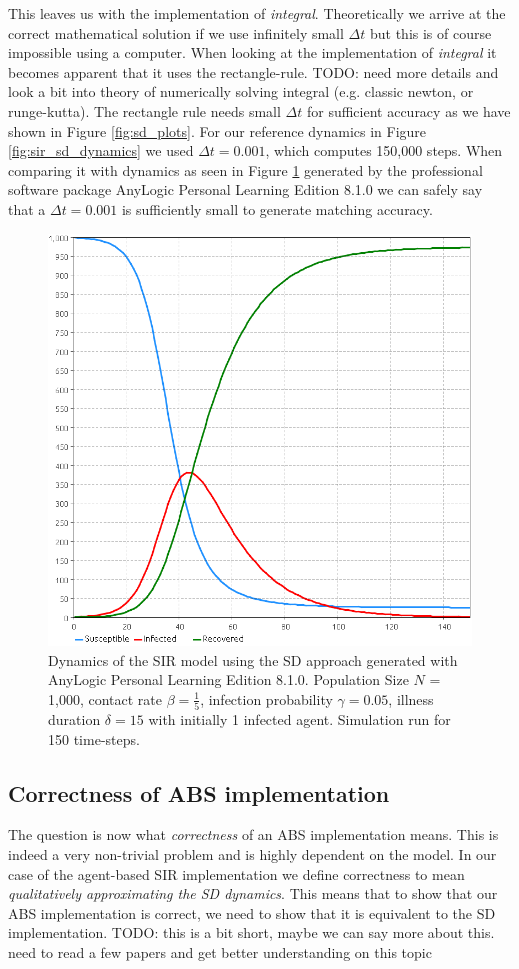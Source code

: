 This leaves us with the implementation of \textit{integral}. Theoretically we arrive at the correct mathematical solution if we use infinitely small $\Delta t$ but this is of course impossible using a computer. When looking at the implementation of \textit{integral} it becomes apparent that it uses the rectangle-rule. TODO: need more details and look a bit into theory of numerically solving integral (e.g. classic newton, or runge-kutta). The rectangle rule needs small $\Delta t$ for sufficient accuracy as we have shown in Figure \ref{fig:sd_plots}.
For our reference dynamics in Figure \ref{fig:sir_sd_dynamics} we used $\Delta t = 0.001$, which computes 150,000 steps. When comparing it with dynamics as seen in Figure \ref{fig:sd_anylogic} generated by the professional software package AnyLogic Personal Learning Edition 8.1.0 we can safely say that a $\Delta t = 0.001$ is sufficiently small to generate matching accuracy.

\begin{figure}
	\centering
	\includegraphics[width=.4\textwidth, angle=0]{./../shared/fig/anylogic/SIR_SD_DYNAMICS_ANYLOGIC.png}
	\caption{Dynamics of the SIR model using the SD approach generated with AnyLogic Personal Learning Edition 8.1.0. Population Size $N$ = 1,000, contact rate $\beta =  \frac{1}{5}$, infection probability $\gamma = 0.05$, illness duration $\delta = 15$ with initially 1 infected agent. Simulation run for 150 time-steps.}
	\label{fig:sd_anylogic}
\end{figure}

\subsection{Correctness of ABS implementation}
The question is now what \textit{correctness} of an ABS implementation means. This is indeed a very non-trivial problem and is highly dependent on the model. In our case of the agent-based SIR implementation we define correctness to mean \textit{qualitatively approximating the SD dynamics}. This means that to show that our ABS implementation is correct, we need to show that it is equivalent to the SD implementation. TODO: this is a bit short, maybe we can say more about this. need to read a few papers and get better understanding on this topic

